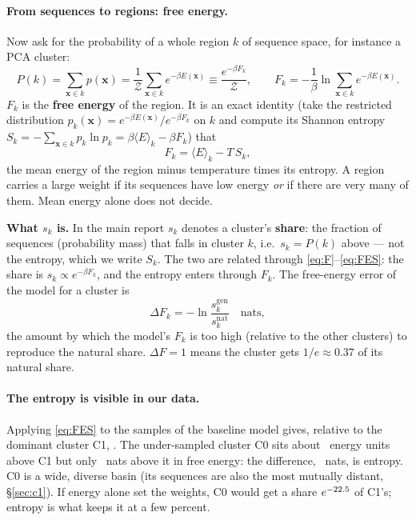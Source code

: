 \documentclass[10pt,a4paper]{article}
\begin{document}
\paragraph{From sequences to regions: free energy.} Now ask for the probability of a whole region
$k$ of sequence space, for instance a PCA cluster:
\begin{equation}
P(k)=\sum_{\bm x\in k}p(\bm x)=\frac{1}{\mathcal Z}\sum_{\bm x\in k}e^{-\beta E(\bm x)}
\equiv\frac{e^{-\beta F_k}}{\mathcal Z},
\qquad
F_k=-\frac1\beta\ln\sum_{\bm x\in k}e^{-\beta E(\bm x)} .
\label{eq:F}
\end{equation}
$F_k$ is the \textbf{free energy} of the region. It is an exact identity (take the restricted
distribution $p_k(\bm x)=e^{-\beta E(\bm x)}/e^{-\beta F_k}$ on $k$ and compute its Shannon entropy
$S_k=-\sum_{\bm x\in k}p_k\ln p_k=\beta\langle E\rangle_k-\beta F_k$) that
\begin{equation}
F_k=\langle E\rangle_k-T\,S_k ,
\label{eq:FES}
\end{equation}
the mean energy of the region minus temperature times its entropy. A region carries a large weight
if its sequences have low energy \emph{or} if there are very many of them. Mean energy alone does
not decide.

\begin{keybox}
\textbf{What $s_k$ is.} In the main report $s_k$ denotes a cluster's \textbf{share}: the fraction of
sequences (probability mass) that falls in cluster $k$, i.e.\ $s_k=P(k)$ above --- not the entropy,
which we write $S_k$. The two are related through \eqref{eq:F}--\eqref{eq:FES}: the share is
$s_k\propto e^{-\beta F_k}$, and the entropy enters through $F_k$. The free-energy error of
the model for a cluster is
\[
\Delta F_k=-\ln\frac{s_k^{\text{gen}}}{s_k^{\text{nat}}}\quad\text{nats},
\]
the amount by which the model's $F_k$ is too high (relative to the other clusters) to reproduce the
natural share. $\Delta F=1$ means the cluster gets $1/e\approx0.37$ of its natural share.
\end{keybox}

\paragraph{The entropy is visible in our data.} Applying \eqref{eq:FES} to the samples of the
baseline model gives, relative to the dominant cluster C1, \ThermoTable. The under-sampled cluster
C0 sits about \ThermoEgap\ energy units above C1 but only \ThermoFgap\ nats above it in free energy:
the difference, \ThermoSgap\ nats, is entropy. C0 is a wide, diverse basin (its sequences are also
the most mutually distant, \S\ref{sec:c1}). If energy alone set the weights, C0 would get a share
$e^{-22.5}$ of C1's; entropy is what keeps it at a few percent.
\end{document}
